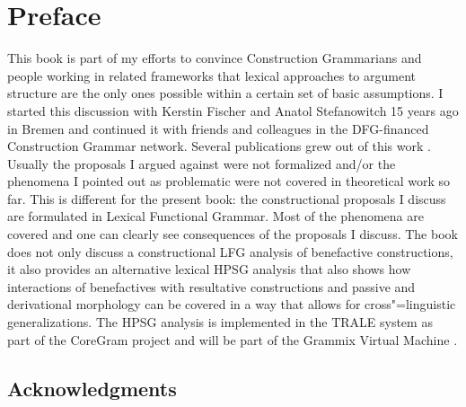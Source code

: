 




%




\frontmatter
\maketitle

\tableofcontents

%


\chapter{Preface}

This book is part of my efforts to convince Construction Grammarians and people working in related
frameworks that lexical approaches to argument structure are the only ones possible within a certain
set of basic assumptions. I started this discussion with Kerstin Fischer and Anatol Stefanowitch 15
years ago in Bremen and continued it with friends and colleagues in the DFG-financed Construction
Grammar network. Several publications grew out of this work
\citep{Mueller2006d,Mueller2007d,MuellerPersian,MWArgSt,MWArgStReply,MW2014a,MuellerSatztypen,MuellerDefaults}. Usually
the proposals I argued against were not formalized and/or the phenomena I pointed out as problematic
were not covered in theoretical work so far. This is different for the present book: the
constructional proposals I discuss are formulated in Lexical Functional Grammar. Most of the
phenomena are covered and one can clearly see consequences of the proposals I discuss. The book does
not only discuss a constructional LFG analysis of benefactive constructions, it also provides an
alternative lexical HPSG analysis that also shows how interactions of benefactives with resultative
constructions and passive and derivational morphology can be covered in a way that allows for
cross"=linguistic generalizations. The HPSG analysis is implemented in the TRALE system
\citep*{MPR2002a-u,Penn2004a-u} as part of the CoreGram project \citep{MuellerCoreGram} and will be part of the Grammix Virtual Machine
\citep{MuellerGrammix}.

\section*{Acknowledgments}

